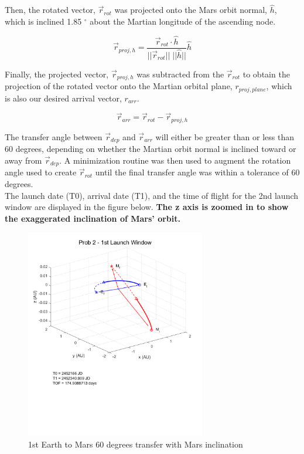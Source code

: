 \documentclass[conf]{new-aiaa}
\begin{document}
Then, the rotated vector, $\overrightarrow{r}_{rot} $ was projected onto the Mars orbit normal, $\hat{h}$, which is inclined 1.85 $^\circ$ about the Martian longitude of the ascending node. 

\begin{equation}
    \overrightarrow{r}_{proj,h}  = \frac{ \overrightarrow{r}_{rot}  \cdot \hat{h} }{ ||\overrightarrow{r}_{rot}|| \; ||\hat{h}|| } \hat{h}
\end{equation}

Finally, the projected vector, $\overrightarrow{r} _{proj,h}$ was subtracted from the $\overrightarrow{r} _{rot}$ to obtain the projection of the rotated vector onto the Martian orbital plane, $r_{proj,plane}$, which is also our desired arrival vector, $r_{arr}$. 

\begin{equation}
    \overrightarrow{r}_{arr} = \overrightarrow{r}_{rot} - \overrightarrow{r}_{proj,h}
\end{equation}

The transfer angle between $\overrightarrow{r}_{dep}$ and $\overrightarrow{r}_{arr}$ will either be greater than or less than 60 degrees, depending on whether the Martian orbit normal is inclined toward or away from $\overrightarrow{r}_{dep}$. A minimization routine was then used to augment the rotation angle used to create $\overrightarrow{r}_{rot}$ until the final transfer angle was within a tolerance of 60 degrees. \\ 

The launch date (T0), arrival date (T1), and the time of flight for the 2nd launch window are displayed in the figure below. \textbf{The z axis is zoomed in to show the exaggerated inclination of Mars' orbit.}

\begin{figure}[H]
    \centering 
    \includegraphics[width=0.7\textwidth]{Prob 2 - 1st Launch Window.pdf}
    \caption{1st Earth to Mars 60 degrees transfer with Mars inclination}
\end{figure}
\end{document}
